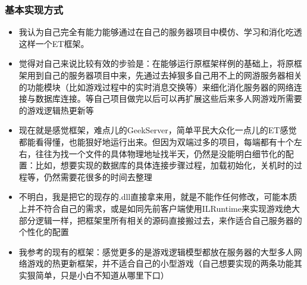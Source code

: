 \documentclass[9pt, b5paper]{article}
\begin{document}
\subsubsection{基本实现方式}
\label{sec-4-1-2}
\begin{itemize}
\item 我认为自己完全有能力能够通过在自己的服务器项目中模仿、学习和消化吃透这样一个ET框架。
\item 觉得对自己来说比较有效的步验是：在能够运行原框架样例的基础上，将原框架用到自己的服务器项目中来，先通过去掉狠多自己用不上的网游服务器相关的功能模块（比如游戏过程中的实时消息交换等）来细化消化服务器的网络连接与数据库连接。等自己项目做完以后可以再扩展这些后来多人网游戏所需要的游戏逻辑热更新等
\item 现在就是感觉框架，难点儿的GeekServer，简单平民大众化一点儿的ET感觉都能看得懂，也能狠好地运行出来。但因为双端过多的项目，每端都有十个左右，往往为找一个文件的具体物理地址找半天，仍然是没能明白细节化的配置：比如，想要实现的数据库的具体连接步骤过程，加载初始化，关机时的过程等，仍然需要花很多的时间去整理
\item 不明白，我是把它的现存的.dll直接拿来用，就是不能作任何修改，可能本质上并不符合自己的需求，或是如同先前客户端使用ILRuntime来实现游戏绝大部分逻辑一样，把框架里所有相关的源码直接搬过去，来作适合自己服务器的个性化的配置
\item 我参考的现有的框架：感觉更多的是游戏逻辑模型都放在服务器的大型多人网络游戏的热更新框架，并不适合自己的小型游戏（自己想要实现的两条功能其实狠简单，只是小白不知道从哪里下口）
\end{itemize}
\end{document}
